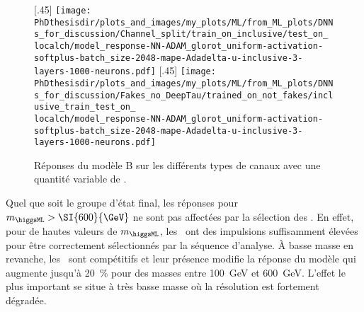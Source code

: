 \begin{figure}[p]
\def\localch{ll}
\subcaptionbox{Canaux \GetChannelStr{\localch}, \DEEPTAU.\label{subfig-B_few_fakes_\localch}}[.45\textwidth]
{\texttt{[image: \\PhDthesisdir/plots\_and\_images/my\_plots/ML/from\_ML\_plots/DNNs\_for\_discussion/Channel\_split/train\_on\_inclusive/test\_on\_\\localch/model\_response-NN-ADAM\_glorot\_uniform-activation-softplus-batch\_size-2048-mape-Adadelta-u-inclusive-3-layers-1000-neurons.pdf]}\vspace{-.5\baselineskip}}
\hfill
\subcaptionbox{Canaux \GetChannelStr{\localch}, BDT.\label{subfig-B_more_fakes_\localch}}[.45\textwidth]
{\texttt{[image: \\PhDthesisdir/plots\_and\_images/my\_plots/ML/from\_ML\_plots/DNNs\_for\_discussion/Fakes\_no\_DeepTau/trained\_on\_not\_fakes/inclusive\_train\_test\_on\_\\localch/model\_response-NN-ADAM\_glorot\_uniform-activation-softplus-batch\_size-2048-mape-Adadelta-u-inclusive-3-layers-1000-neurons.pdf]}\vspace{-.5\baselineskip}}

\caption[Effet des \ftauhs\ sur la réponse du modèle B.]{Réponses du modèle B sur les différents types de canaux avec une quantité variable de \ftauhs.}
\label{fig-fakes_B_tt-lt-ll}
\end{figure}
Quel que soit le groupe d'état final, les réponses pour $m_{\higgsML}>\SI{600}{\GeV}$ ne sont pas affectées par la sélection des \tauh.
En effet, pour de hautes valeurs de $m_{\higgsML}$, les \tauh\ ont des impulsions suffisamment élevées pour être correctement sélectionnés par la séquence d'analyse.
À basse masse en revanche,
les \ftauhs\ sont compétitifs et
leur présence modifie la réponse du modèle
qui augmente jusqu'à \SI{20}{\%}
pour des masses entre \SI{100}{\GeV} et \SI{600}{\GeV}.
L'effet le plus important se situe à très basse masse où la résolution est fortement dégradée.
